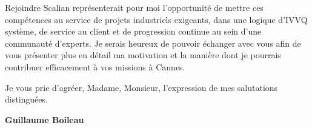 \documentclass[11pt,a4paper]{altacv}
\begin{document}
{Rejoindre Scalian représenterait pour moi l'opportunité de mettre ces compétences au service de projets industriels exigeants, dans une logique d'IVVQ système, de service au client et de progression continue au sein d'une communauté d'experts. Je serais heureux de pouvoir échanger avec vous afin de vous présenter plus en détail ma motivation et la manière dont je pourrais contribuer efficacement à vos missions à Cannes.

Je vous prie d'agréer, Madame, Monsieur, l'expression de mes salutations distinguées.

\textbf{Guillaume Boileau}

}
\end{document}
